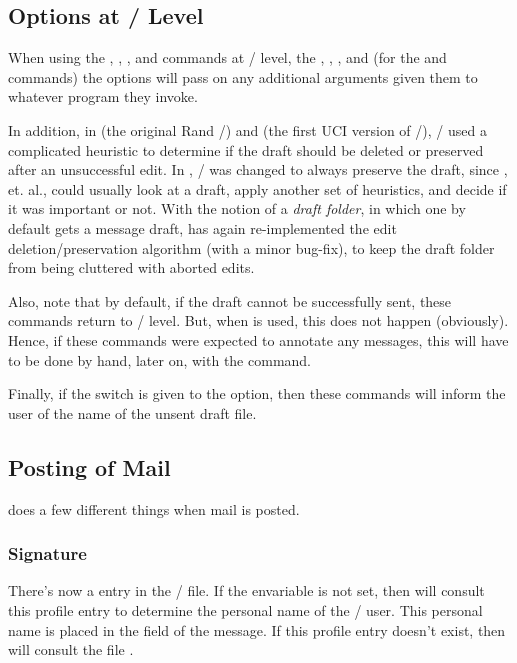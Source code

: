 \subsection{Options at\/{ }\whatnow/ Level}
When using the , , , and  commands at
\whatnow/ level,
the , , ,
and (for the  and  commands) the  options
will pass on any additional arguments given them to whatever program they
invoke.
\par
In addition,
in  (the original Rand \MH/)
and  (the first UCI version of \MH/),
\MH/ used a complicated heuristic to determine if the draft should be deleted
or preserved after an unsuccessful edit.
In ,
\MH/ was changed to always preserve the draft,
since , et. al.,
could usually look at a draft, apply another set of heuristics,
and decide if it was important or not.
With the notion of a {\it draft folder}, 
in which one by default gets a  message draft,
 has again re-implemented the edit deletion/preservation
algorithm (with a minor bug-fix),
to keep the draft folder from being cluttered with aborted edits.
\par
Also,
note that by default,
if the draft cannot be successfully sent,
these commands return to \whatnow/ level.
But, when  is used, this does not happen (obviously).
Hence,
if these commands were expected to annotate any messages,
this will have to be done by hand, later on, with the  command.
\par
Finally, if the  switch is given to the  option,
then these commands will inform the user of the name of the unsent draft file.
\subsection{Posting of Mail}
 does a few different things when mail is posted.
\subsubsection{Signature}
There's now a  entry in the \profile/ file.
If the  envariable is not set,
then  will consult this profile entry to determine the
personal name of the \MH/ user.
This personal name is placed in the  field of the message.
If this profile entry doesn't exist,
then  will consult the file .
